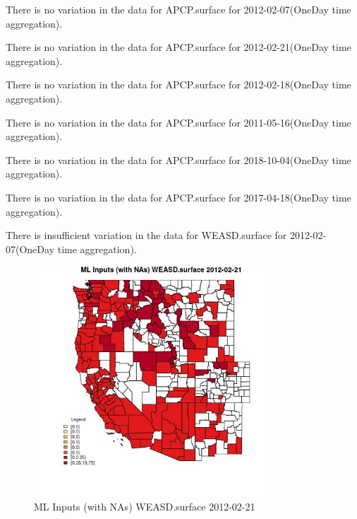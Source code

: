 There is no variation in the data for APCP.surface for 2012-02-07(OneDay time aggregation). 
 

There is no variation in the data for APCP.surface for 2012-02-21(OneDay time aggregation). 
 

There is no variation in the data for APCP.surface for 2012-02-18(OneDay time aggregation). 
 

There is no variation in the data for APCP.surface for 2011-05-16(OneDay time aggregation). 
 

There is no variation in the data for APCP.surface for 2018-10-04(OneDay time aggregation). 
 

There is no variation in the data for APCP.surface for 2017-04-18(OneDay time aggregation). 
 

There is insufficient variation in the data for WEASD.surface for 2012-02-07(OneDay time aggregation). 
 

\begin{figure} 
\centering  
\includegraphics[width=0.77\textwidth]{Code_Outputs/Report_ML_input_PM25_Step4_part_f_de_duplicated_aveswNAs_CountyWEASDsurfaceMean2012-02-21.jpg} 
\caption{\label{fig:Report_ML_input_PM25_Step4_part_f_de_duplicated_aveswNAsCountyWEASDsurfaceMean2012-02-21}ML Inputs (with NAs) WEASD.surface 2012-02-21} 
\end{figure} 
 

